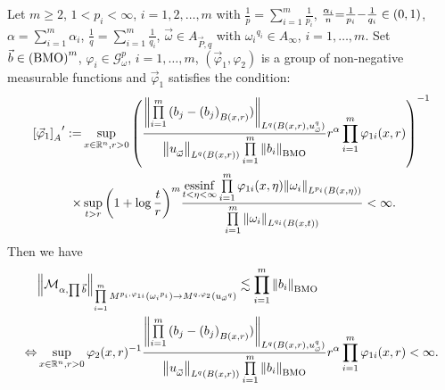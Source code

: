\documentclass[11pt, twoside, leqno]{article}
\begin{document}
\begin{thm}\label{CCFRM1}
	Let $m\geq 2$, $1< p_i<\infty$, $i=1,2,\ldots,m$ with $\frac{1}{p} = \sum\limits_{i = 1}^m {\frac{1}{{{p_i}}}}$, $\frac{{{\alpha _i}}}{n}{\rm{ = }}\frac{1}{{{p_i}}}{\rm{ - }}\frac{1}{{{q_i}}} \in (0,1)$, $\alpha  = \sum\limits_{i = 1}^m {{\alpha _i}}$, $\frac{1}{q} = \sum\limits_{i = 1}^m {\frac{1}{{{q_i}}}}$, $\vec{\omega}\in {A_{\vec P,q}}$ with ${\omega _i}^{{q_i}} \in {A_\infty }$, $i = 1, \ldots ,m$. Set $\vec b \in {\left( {\rm BMO} \right)^m}$, ${\varphi _i} \in \mathcal{G}_\omega ^p$, $i = 1, \ldots ,m$, $({{\vec \varphi }_1},{\varphi _2})$ is a group of non-negative measurable functions and ${{\vec \varphi }_1}$ satisfies the condition:
	\begin{align}\label{cen2}
	{\left[ {{{\vec \varphi }_1}} \right]_A}^{\prime }: =& \mathop {\sup }\limits_{x \in {{\mathbb R^n}},r > 0} {\left( {\frac{{{{\left\| {\prod\limits_{i = 1}^m {({b_j} - {{({b_j})}_{B(x,r)}})} } \right\|}_{{L^q}{(B(x,r),u_{\vec \omega }^q)}}}}}{{{{\left\| {u_{\vec \omega }^{}} \right\|}_{{L^q}(B(x,r))}}\prod\limits_{i = 1}^m {{{\left\| {{b_i}} \right\|}_{\rm BMO}}} }}{r^\alpha }\prod\limits_{i = 1}^m {{\varphi _{1i}}(x,r)} } \right)^{ - 1}}\notag\\
	\times& \mathop {\sup }\limits_{t > r} {\left( {1 + \log \frac{t}{r}} \right)^m}\frac{{\mathop {{\rm{essinf}}}\limits_{t < \eta  < \infty } \prod\limits_{i = 1}^m {{\varphi _{1i}}(x,\eta ){{\left\| {{\omega _i}} \right\|}_{{L^{{p_i}}}(B(x,\eta ))}}} }}{{\prod\limits_{i = 1}^m {{{\left\| {{\omega _i}} \right\|}_{{L^{{q_i}}}(B(x,t))}}} }} < \infty.
	\end{align}
	Then we have
	\begin{align}
	&{\left\| {\mathcal{M}_{\alpha, \prod \vec b }} \right\|_{\prod\limits_{i = 1}^m {{M^{{p_i},{\varphi _{1i}}}}\left( {{\omega _i}^{{p_i}}} \right)}  \to {M^{q,{\varphi _2}}}\left( {{u_{\vec \omega }}^q} \right)}} \lesssim \prod\limits_{i = 1}^m {{{\left\| {{b_i}} \right\|}_{\rm BMO}}}\notag\\
	\Leftrightarrow& \mathop {\sup }\limits_{x \in {{\mathbb R^n}},r > 0} {\varphi _2}{(x,r)^{ - 1}}\frac{{{{\left\| {\prod\limits_{i = 1}^m {({b_j} - {{({b_j})}_{B(x,r)}})} } \right\|}_{{L^q}{(B(x,r),u_{\vec \omega }^q)}}}}}{{{{\left\| {u_{\vec \omega }^{}} \right\|}_{{L^q}(B(x,r))}}\prod\limits_{i = 1}^m {{{\left\| {{b_i}} \right\|}_{\rm BMO}}} }}{r^\alpha }\prod\limits_{i = 1}^m {{\varphi _{1i}}(x,r)}  < \infty.
	\end{align}
\end{thm}
\end{document}
